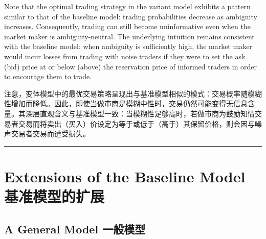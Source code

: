 \documentclass[12pt,a4paper]{article}
\newenvironment{original}{%
  \par\vspace{4pt}\noindent%
  \color{black}%
  \ignorespaces
}{%
  \par\vspace{2pt}%
}
\newenvironment{translation}{%
  \par\vspace{2pt}\noindent%
  \color{transblue}%
  \ignorespaces
}{%
  \par\vspace{4pt}\hrule\vspace{6pt}%
}
\begin{document}
\begin{original}
Note that the optimal trading strategy in the variant model exhibits a pattern similar to that of the baseline model: trading probabilities decrease as ambiguity increases. Consequently, trading can still become uninformative even when the market maker is ambiguity-neutral. The underlying intuition remains consistent with the baseline model: when ambiguity is sufficiently high, the market maker would incur losses from trading with noise traders if they were to set the ask (bid) price at or below (above) the reservation price of informed traders in order to encourage them to trade.
\end{original}
\begin{translation}
注意，变体模型中的最优交易策略呈现出与基准模型相似的模式：交易概率随模糊性增加而降低。因此，即使当做市商是模糊中性时，交易仍然可能变得无信息含量。其深层直观含义与基准模型一致：当模糊性足够高时，若做市商为鼓励知情交易者交易而将卖出（买入）价设定为等于或低于（高于）其保留价格，则会因与噪声交易者交易而遭受损失。
\end{translation}

\newpage

\section{Extensions of the Baseline Model \hfill 基准模型的扩展}

\subsection{A General Model \hfill 一般模型}
\end{document}
